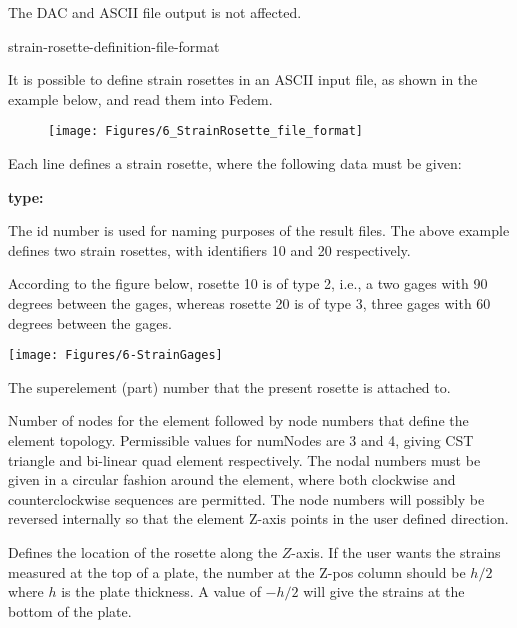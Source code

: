 {The DAC and ASCII file output is not affected.

\clearpage


           {strain-rosette-definition-file-format}

It is possible to define strain rosettes in an ASCII input file, as
shown in the example below, and read them into Fedem.

\begin{figure}[!h]
  \texttt{[image: Figures/6\_StrainRosette\_file\_format]}
\end{figure}

Each line defines a strain rosette, where the following data must be given:
%
\begin{namelist}{\bf type:}
\item[\sl\textbf{id:}]
  The id number is used for naming purposes of the result files.
  The above example defines two strain rosettes,
  with identifiers 10 and 20 respectively.

\item[\sl\textbf{type:}]
  According to the figure below, rosette 10 is of type 2, i.e., a two gages
  with 90 degrees between the gages, whereas rosette 20 is of type 3,
  three gages with 60 degrees between the gages.

  \hspace*{-0.33\textwidth}
  \texttt{[image: Figures/6-StrainGages]}

\item[\sl\textbf{link:}]
  The superelement (part) number that the present rosette is attached to.

\item[\sl\textbf{numNodes n1 n2 n3 (n4):}]
  Number of nodes for the element followed by node numbers that define the
  element topology. Permissible values for numNodes are 3 and 4,
  giving CST triangle and bi-linear quad element respectively.
  The nodal numbers must be given in a circular fashion around the element,
  where both clockwise and counterclockwise sequences are permitted.
  The node numbers will possibly be reversed internally so that the element
  Z-axis points in the user defined direction.

\item[\sl\textbf{zPos:}]
  Defines the location of the rosette along the $Z$-axis.
  If the user wants the strains measured at the top of a plate, the number at
  the Z-pos column should be $h/2$ where $h$ is the plate thickness.
  A value of $-h/2$ will give the strains at the bottom of the plate.


\end{namelist}}
